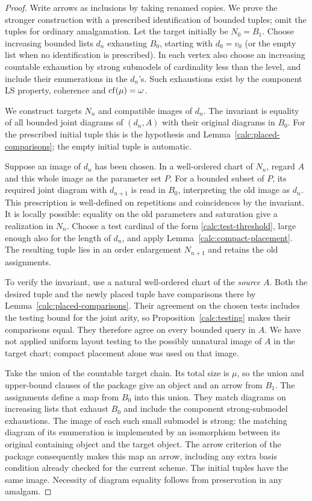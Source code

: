 \begin{proof}
Write arrows as inclusions by taking renamed copies.  We prove the
stronger construction with a prescribed identification of bounded
tuples; omit the tuples for ordinary amalgamation.  Let the target
initially be $N_0=B_1$.  Choose increasing bounded lists $d_n$ exhausting
$B_0$, starting with $d_0=v_0$ (or the empty list when no identification
is prescribed).  In each vertex also choose an
increasing countable exhaustion by strong submodels of cardinality less
than the level, and include their enumerations in the $d_n$'s.  Such
exhaustions exist by the component LS property, coherence and
$\operatorname{cf}(\mu)=\omega$.

We construct targets $N_n$ and compatible images of $d_n$.  The invariant
is equality of all bounded joint diagrams of $(d_n,A)$ with their
original diagrams in $B_0$.  For the prescribed initial tuple this is
the hypothesis and Lemma~\ref{calc:placed-comparisons}; the empty initial
tuple is automatic.

Suppose an image of $d_n$ has been chosen.  In a well-ordered chart of
$N_n$, regard $A$ and this whole image as the parameter set $P$.
For a bounded subset of $P$, its required joint diagram with $d_{n+1}$
is read in $B_0$, interpreting the old image as $d_n$.  This prescription
is well-defined on repetitions and coincidences by the invariant.
It is locally possible: equality on the old parameters and saturation
give a realization in $N_n$.  Choose a test cardinal of the form
\eqref{calc:test-threshold}, large enough also for the length of $d_n$,
and apply Lemma~\ref{calc:compact-placement}.  The resulting tuple lies
in an order enlargement $N_{n+1}$ and retains the old assignments.

To verify the invariant, use a natural well-ordered chart of the
\emph{source} $A$.  Both the desired tuple and the newly placed tuple
have comparisons there by Lemma~\ref{calc:placed-comparisons}.  Their
agreement on the chosen tests includes the testing bound for the joint
arity, so Proposition~\ref{calc:testing} makes their comparisons equal.
They therefore agree on every bounded query in $A$.  We have not
applied uniform layout testing to the possibly unnatural image of $A$
in the target chart; compact placement alone was used on that image.

Take the union of the countable target chain.  Its total size is $\mu$,
so the union and upper-bound clauses of the package give an object and
an arrow from $B_1$.  The assignments define a map from $B_0$ into this
union.  They match diagrams on increasing lists that exhaust $B_0$ and
include the component strong-submodel exhaustions.  The image of each
such small submodel is strong: the matching diagram of its enumeration
is implemented by an isomorphism between its original containing
object and the target object.  The arrow criterion
of the package consequently makes this map an arrow, including any
extra basis condition already checked for the current scheme.  The
initial tuples have the same image.  Necessity of diagram equality
follows from preservation in any amalgam.


\end{proof}

